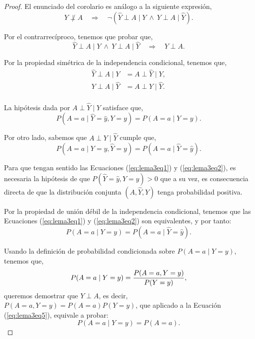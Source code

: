 \documentclass[oneside,openright,titlepage,numbers=noenddot,openany,headinclude,footinclude=true,
cleardoublepage=empty,abstractoff,BCOR=5mm,paper=a4,fontsize=12pt,main=spanish]{scrreprt}
\begin{document}
\begin{proof}
El enunciado del corolario es análogo a la siguiente expresión,
\begin{equation*}
Y \not \perp A \quad \Longrightarrow \quad \neg(\hat{Y} \perp A \mid Y \ \wedge \ Y \perp A \mid \hat{Y}).
\end{equation*}

Por el contrarrecíproco, tenemos que probar que,
\begin{equation*}
\hat{Y} \perp A \mid Y \ \wedge \ Y \perp A \mid \hat{Y} \quad \Longrightarrow \quad Y \perp A.
\end{equation*}

Por la propiedad simétrica de la independencia condicional, tenemos que,
\begin{equation*}
\begin{split}
\hat{Y} \perp A \mid Y &= A \perp \hat{Y} \mid Y,\\
Y \perp A \mid \hat{Y} &= A \perp Y \mid \hat{Y}.\\
\end{split}
\end{equation*}


La hipótesis dada por $A \perp \hat{Y} \mid Y$ satisface que,
\begin{equation}\label{eq:lema3eq1}
P(A=a \mid \hat{Y}=\hat{y}, Y=y)=P(A=a \mid Y=y).
\end{equation}

Por otro lado, sabemos que $A \perp Y \mid \hat{Y}$ cumple que,
\begin{equation}\label{eq:lema3eq2}
P(A=a \mid Y=y, \hat{Y}=\hat{y})=P(A=a\mid \hat{Y}=\hat{y}).
\end{equation}

Para que tengan sentido las Ecuaciones (\ref{eq:lema3eq1}) y (\ref{eq:lema3eq2}), es necesaria la hipótesis de que $P(\hat{Y}=\hat{y},Y=y)>0$ que a su vez, es consecuencia directa de que la distribución conjunta $(A,\hat{Y},Y)$ tenga probabilidad positiva.

Por la propiedad de unión débil de la independencia condicional, tenemos que las Ecuaciones (\ref{eq:lema3eq1}) y (\ref{eq:lema3eq2}) son equivalentes, y por tanto:
\begin{equation}\label{eq:lema3eq3}
P(A=a\mid Y=y)=P(A=a\mid \hat{Y}=\hat{y}).
\end{equation}

Usando la definición de probabilidad condicionada sobre $P(A=a\mid Y=y)$, tenemos que, 
\begin{equation}\label{eq:lema3eq5}
P(A=a\mid Y=y)=\frac{\displaystyle P(A=a,Y=y)}{\displaystyle P(Y=y)},
\end{equation}
queremos demostrar que $Y\perp A$, es decir, $P(A=a,Y=y)=P(A=a)P(Y=y)$, que aplicado a la Ecuación (\ref{eq:lema3eq5}), equivale a probar:
\begin{equation*}
P(A=a\mid Y=y)=P(A=a).
\end{equation*}


\end{proof}
\end{document}

